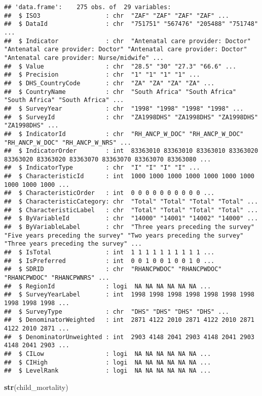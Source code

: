 \documentclass[
]{article}
\newenvironment{Shaded}{\begin{snugshade}}{\end{snugshade}}
\newcommand{\FunctionTok}[1]{\textcolor[rgb]{0.13,0.29,0.53}{\textbf{#1}}}
\newcommand{\NormalTok}[1]{#1}
\begin{document}
\begin{verbatim}
## 'data.frame':    275 obs. of  29 variables:
##  $ ISO3                  : chr  "ZAF" "ZAF" "ZAF" "ZAF" ...
##  $ DataId                : chr  "751751" "567476" "205488" "751748" ...
##  $ Indicator             : chr  "Antenatal care provider: Doctor" "Antenatal care provider: Doctor" "Antenatal care provider: Doctor" "Antenatal care provider: Nurse/midwife" ...
##  $ Value                 : chr  "28.5" "30" "27.3" "66.6" ...
##  $ Precision             : chr  "1" "1" "1" "1" ...
##  $ DHS_CountryCode       : chr  "ZA" "ZA" "ZA" "ZA" ...
##  $ CountryName           : chr  "South Africa" "South Africa" "South Africa" "South Africa" ...
##  $ SurveyYear            : chr  "1998" "1998" "1998" "1998" ...
##  $ SurveyId              : chr  "ZA1998DHS" "ZA1998DHS" "ZA1998DHS" "ZA1998DHS" ...
##  $ IndicatorId           : chr  "RH_ANCP_W_DOC" "RH_ANCP_W_DOC" "RH_ANCP_W_DOC" "RH_ANCP_W_NRS" ...
##  $ IndicatorOrder        : int  83363010 83363010 83363010 83363020 83363020 83363020 83363070 83363070 83363070 83363080 ...
##  $ IndicatorType         : chr  "I" "I" "I" "I" ...
##  $ CharacteristicId      : int  1000 1000 1000 1000 1000 1000 1000 1000 1000 1000 ...
##  $ CharacteristicOrder   : int  0 0 0 0 0 0 0 0 0 0 ...
##  $ CharacteristicCategory: chr  "Total" "Total" "Total" "Total" ...
##  $ CharacteristicLabel   : chr  "Total" "Total" "Total" "Total" ...
##  $ ByVariableId          : chr  "14000" "14001" "14002" "14000" ...
##  $ ByVariableLabel       : chr  "Three years preceding the survey" "Five years preceding the survey" "Two years preceding the survey" "Three years preceding the survey" ...
##  $ IsTotal               : int  1 1 1 1 1 1 1 1 1 1 ...
##  $ IsPreferred           : int  0 0 1 0 0 1 0 0 1 0 ...
##  $ SDRID                 : chr  "RHANCPWDOC" "RHANCPWDOC" "RHANCPWDOC" "RHANCPWNRS" ...
##  $ RegionId              : logi  NA NA NA NA NA NA ...
##  $ SurveyYearLabel       : int  1998 1998 1998 1998 1998 1998 1998 1998 1998 1998 ...
##  $ SurveyType            : chr  "DHS" "DHS" "DHS" "DHS" ...
##  $ DenominatorWeighted   : int  2871 4122 2010 2871 4122 2010 2871 4122 2010 2871 ...
##  $ DenominatorUnweighted : int  2903 4148 2041 2903 4148 2041 2903 4148 2041 2903 ...
##  $ CILow                 : logi  NA NA NA NA NA NA ...
##  $ CIHigh                : logi  NA NA NA NA NA NA ...
##  $ LevelRank             : logi  NA NA NA NA NA NA ...
\end{verbatim}

\begin{Shaded}
\begin{Highlighting}[]
\FunctionTok{str}\NormalTok{(child\_mortality)}
\end{Highlighting}
\end{Shaded}
\end{document}
